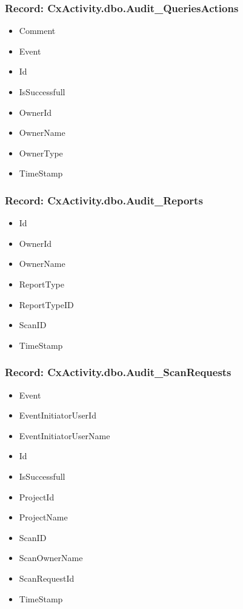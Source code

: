 \subsubsection{Record: CxActivity.dbo.Audit\_QueriesActions}
\begin{itemize}
    \item Comment
    \item Event
    \item Id
    \item IsSuccessfull
    \item OwnerId
    \item OwnerName
    \item OwnerType
    \item TimeStamp
\end{itemize}


\subsubsection{Record: CxActivity.dbo.Audit\_Reports}
\begin{itemize}
    \item Id
    \item OwnerId
    \item OwnerName
    \item ReportType
    \item ReportTypeID
    \item ScanID
    \item TimeStamp
\end{itemize}

\subsubsection{Record: CxActivity.dbo.Audit\_ScanRequests}
\begin{itemize}
    \item Event
    \item EventInitiatorUserId
    \item EventInitiatorUserName
    \item Id
    \item IsSuccessfull
    \item ProjectId
    \item ProjectName
    \item ScanID
    \item ScanOwnerName
    \item ScanRequestId
    \item TimeStamp
\end{itemize}

